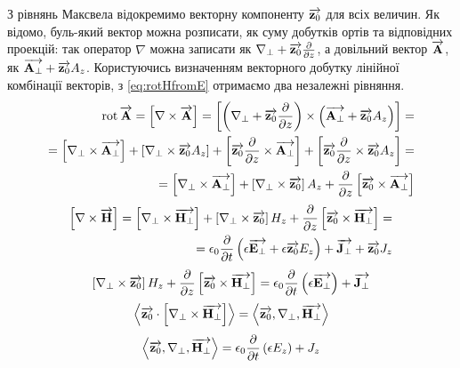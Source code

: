 З рівнянь Максвела відокремимо векторну компоненту 
$ \vect{z_0} $ для всіх величин. Як відомо, буль-який вектор можна розписати, 
як суму добутків ортів та відповідних проекцій: так оператор $ \nabla $ можна 
записати як $ \nabla_\perp + \vect{z_0} \partder{}{z} $, а довільний вектор
$ \vect{A} $, як $ \vect{A_\perp} + \vect{z_0} A_z $. Користуючись визначенням 
векторного добутку лінійної комбінації векторів, з \eqref{eq:rotHfromE} 
отримаємо два незалежні рівняння.
%
\textcolor{lightgray}{ \begin{equation*} \begin{aligned}
\rot{\vect{A}} = \crossprod{\nabla}{\vect{A}} = \crossprod
{\left( \nabla_\perp + \vect{z_0} \partder{}{z} \right)}
{\left( \vect{A_\perp} + \vect{z_0} A_z \right)} = \\
= \crossprod{\nabla_\perp}{\vect{A_\perp}} + 
\crossprod{\nabla_\perp}{\vect{z_0} A_z} +
\crossprod{\vect{z_0} \partder{}{z}}{\vect{A_\perp}} +
\crossprod{ \vect{z_0} \partder{}{z} }{ \vect{z_0} A_z } = \\
= \crossprod{\nabla_\perp}{\vect{A_\perp}} + 
\crossprod{\nabla_\perp}{\vect{z_0}} A_z +
\partder{}{z} \crossprod{\vect{z_0}}{\vect{A_\perp}}
\end{aligned} \end{equation*} }
%
\textcolor{lightgray}{ \begin{equation*} \begin{aligned}
\crossprod{\nabla}{\vect{H}} = 
\crossprod{\nabla_\perp}{\vect{H_\perp}} + 
\crossprod{\nabla_\perp}{\vect{z_0}} H_z +
\partder{}{z} \crossprod{\vect{z_0}}{\vect{H_\perp}} = \\
= \epsilon_0 \partder{}{t} \left( \epsilon  \vect{E_\perp} + 
\epsilon \vect{z_0} E_z \right) + \vect{J_\perp} + \vect{z_0} J_z
\end{aligned} \end{equation*} }
%
\begin{equation} \label{eq:rotHt} 
\crossprod{\nabla_\perp}{\vect{z_0}} H_z +
\partder{}{z} \crossprod{\vect{z_0}}{\vect{H_\perp}} =
\epsilon_0 \partder{}{t} \left( \epsilon  \vect{E_\perp} \right) + 
\vect{J_\perp}
\end{equation}
%
\textcolor{lightgray}{ \begin{equation*} \begin{aligned}
\dotprod{\vect{z_0}}{\crossprod{\nabla_\perp}{\vect{H_\perp}}} =
\triple{\vect{z_0}}{\nabla_\perp}{\vect{H_\perp}}
\end{aligned} \end{equation*} }
%
\begin{equation} \label{eq:rotHz}
\triple{\vect{z_0}}{\nabla_\perp}{\vect{H_\perp}} = 
\epsilon_0 \partder{}{t} \left( \epsilon  E_z \right) + J_z 
\end{equation}

